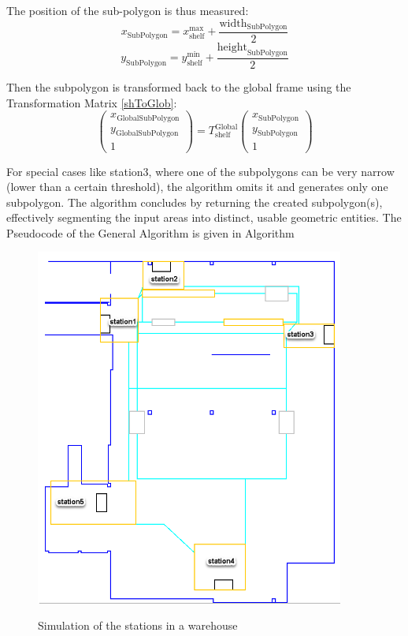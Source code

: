 The position of the sub-polygon is thus measured:
\begin{equation}
x_{\text{SubPolygon}} = x_{\text{shelf}}^{\text{max}} + \frac{\text{width}_{\text{SubPolygon}}}{2}
\end{equation}
\begin{equation}
y_{\text{SubPolygon}} = y_{\text{shelf}}^{\text{min}} + \frac{\text{height}_{\text{SubPolygon}}}{2}
\end{equation}

Then the subpolygon is transformed back to the global frame using the Transformation 
Matrix \ref{shToGlob}:
\begin{equation}
\begin{pmatrix}
x_{\text{GlobalSubPolygon}} \\
y_{\text{GlobalSubPolygon}} \\
1
\end{pmatrix}
=
T_{\text{shelf}}^{\text{Global}}
\begin{pmatrix}
x_{\text{SubPolygon}} \\
y_{\text{SubPolygon}} \\
1
\end{pmatrix}
\end{equation}


For special cases like station3, where one of the subpolygons can be very narrow (lower than a 
certain threshold), the algorithm omits it and generates only one subpolygon. 
The algorithm concludes by returning the created subpolygon(s), effectively segmenting the 
input areas into distinct, usable geometric entities.
The Pseudocode of the General Algorithm is given in Algorithm 


\begin{figure}[H]
    \begin{center}
        \includegraphics[width=4in]{images/Chap2/warehouse.png}\\
        \caption{Simulation of the stations in a warehouse}
        \label{warehouse}
        \end{center}    
\end{figure}

